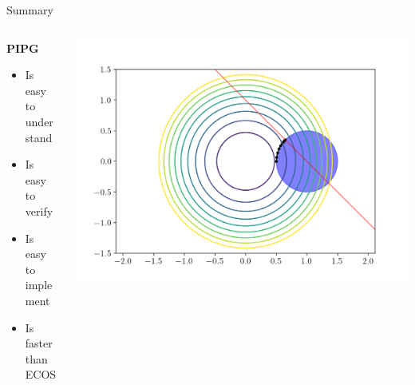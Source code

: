 \documentclass[aspectratio=169]{beamer}
\begin{document}
\begin{frame}{Summary}
    \begin{columns}[T]
        \begin{column}{0.35\textwidth}
            \textbf{PIPG}
            \begin{itemize}
                \item Is easy to understand
                \item Is easy to verify
                \item Is easy to implement
                \item Is faster than ECOS
            \end{itemize}        
        \end{column}
        \begin{column}{0.65\textwidth}
            \includegraphics[width=\textwidth]{img/pipg_candy.png}
        \end{column}
    \end{columns}
\end{frame}
\end{document}
